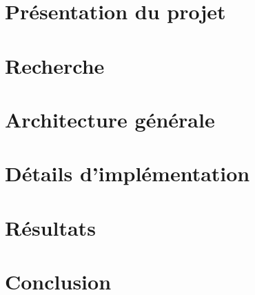 \documentclass[11pt,a4paper]{article}
\begin{document}
\section{Présentation du projet}

\section{Recherche}

\section{Architecture générale}

\section{Détails d'implémentation}

\section{Résultats}

\section{Conclusion}
\end{document}
